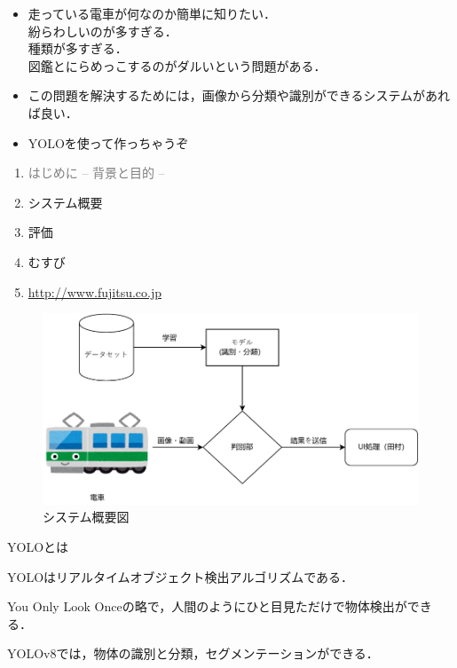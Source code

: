 \begin{itemize}
	\item 走っている電車が何なのか簡単に知りたい．\\
	紛らわしいのが多すぎる．\\
	種類が多すぎる．\\
	図鑑とにらめっこするのがダルいという問題がある．
	\item この問題を解決するためには，画像から分類や識別ができるシステムがあれば良い．
	\item YOLOを使って作っちゃうぞ
\end{itemize}
\begin{enumerate}[itemsep=0.25\zh]
	\item \textcolor{gray}{はじめに -- 背景と目的 --}
	\item システム概要
	\item 評価
	\item むすび
    \item \url{http://www.fujitsu.co.jp}
\end{enumerate}
\newpage



\begin{figure}[h]
\begin{center}
\includegraphics[scale = 1.3]{fig/system_2.drawio.pdf}
\caption{システム概要図}
\end{center}
\end{figure}
\newpage

{\Large YOLOとは}
\begin{description}
	\item YOLOはリアルタイムオブジェクト検出アルゴリズムである．
	\item You Only Look Onceの略で，人間のようにひと目見ただけで物体検出ができる．
	\item YOLOv8では，物体の識別と分類，セグメンテーションができる．
	\newpage
\end{description}
	
